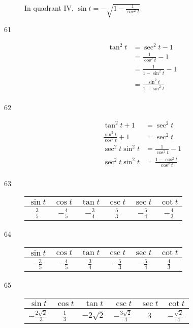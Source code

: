 \documentclass{exam}
\begin{document}
\begin{description}
        In quadrant IV, $\sin t = \boxed{ - \sqrt{ 1 - \frac{1}{\sec^2 t} } }$ 

      \item[61] 
        \begin{align*}
          \tan^2 t & = \sec^2 t - 1 \\
                   & = \frac{1}{\cos^2 t} - 1 \\
                   & = \frac{1}{1 - \sin^2 t}  - 1 \\
                   & = \boxed{ \frac{\sin^2 t}{1 - \sin^2 t} } \\
        \end{align*}

      \item[62] 
        \begin{align*}
          \tan^2 t + 1                  & = \sec^2 t \\
          \frac{\sin^2 t}{\cos^2 t} + 1 & = \sec^2 t \\
          \sec^2 t \sin^2 t             & = \frac{1}{\cos^2 t} - 1 \\
          \sec^2 t \sin^2 t             & = \boxed{ \frac{1 - \cos^2 t}{\cos^2 t} } \\
        \end{align*}

      \item[63]
        \begin{tabular}[H]{cccccc}
          \toprule
          $\sin t$      & $\cos t$        & $\tan t$        & $\csc t$      & $\sec t$        & $\cot t$ \\
          \midrule
          $\frac{3}{5}$ & $- \frac{4}{5}$ & $- \frac{3}{4}$ & $\frac{5}{3}$ & $- \frac{5}{4}$ & $- \frac{4}{3}$ \\
          \bottomrule
        \end{tabular}

      \item[64]
        \begin{tabular}[H]{cccccc}
          \toprule
          $\sin t$        & $\cos t$        & $\tan t$      & $\csc t$        & $\sec t$        & $\cot t$ \\
          \midrule
          $- \frac{3}{5}$ & $- \frac{4}{5}$ & $\frac{3}{4}$ & $- \frac{5}{3}$ & $- \frac{5}{4}$ & $\frac{4}{3}$ \\
          \bottomrule
        \end{tabular}

      \item[65]
        \begin{tabular}[H]{cccccc}
          \toprule
          $\sin t$                 & $\cos t$      & $\tan t$       & $\csc t$                 & $\sec t$ & $\cot t$ \\
          \midrule
          $- \frac{2 \sqrt{2}}{3}$ & $\frac{1}{3}$ & $- 2 \sqrt{2}$ & $- \frac{3 \sqrt{2}}{4}$ & $3$      & $- \frac{\sqrt{2}}{4}$ \\
          \bottomrule
        \end{tabular}


\end{description}
\end{document}
